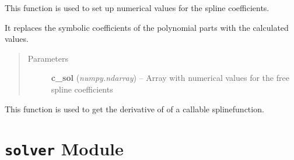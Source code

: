 \documentclass[letterpaper,10pt,english]{sphinxmanual}
\begin{document}
\begin{fulllineitems}
\begin{fulllineitems}
\end{fulllineitems}


\begin{fulllineitems}
\label{pytrajectory:pytrajectory.spline.CubicSpline.set_coeffs}
This function is used to set up numerical values for the spline coefficients.

It replaces the symbolic coefficients of the polynomial parts with the calculated values.
\begin{quote}\begin{description}
\item[{Parameters}] \leavevmode
\textbf{c\_sol} (\emph{numpy.ndarray}) -- Array with numerical values for the free spline coefficients

\end{description}\end{quote}

\end{fulllineitems}


\end{fulllineitems}


\begin{fulllineitems}
\label{pytrajectory:pytrajectory.spline.fdiff}
This function is used to get the derivative of of a callable splinefunction.
\begin{quote}\begin{description}
\end{description}\end{quote}

\end{fulllineitems}



\section{\texttt{solver} Module}
\label{pytrajectory:module-pytrajectory.solver}\label{pytrajectory:solver-module}
\end{document}
